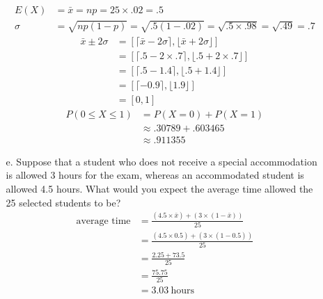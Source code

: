 \documentclass[letterpaper,12pt]{article}
\begin{document}
\begin{enumerate}
\begin{enumerate}
        \begin{align*}
          E(X) &= \bar{x} = np = 25 \times .02 = .5 \\
          \sigma &= \sqrt{np(1 - p)} = \sqrt{.5(1 - .02)} = \sqrt{.5 \times .98} = \sqrt{.49}  = .7
        \end{align*}
        \begin{align*}
          \bar{x} \pm 2\sigma &= [\lceil \bar{x} - 2\sigma \rceil, \lfloor \bar{x} + 2\sigma \rfloor] \\
          &= [\lceil .5 - 2 \times .7 \rceil, \lfloor .5 + 2 \times .7 \rfloor] \\
          &= [\lceil .5 - 1.4 \rceil, \lfloor .5 + 1.4 \rfloor] \\
          &= [\lceil -0.9 \rceil, \lfloor 1.9 \rfloor] \\
          &= [0, 1]
        \end{align*}
        \begin{align*}
          P(0 \le X \le 1) &= P(X = 0) + P(X = 1) \\
          &\approx .30789 + .603465 \\
          &\approx .911355
        \end{align*}
      \item[e.]
        Suppose that a student who does not receive a special accommodation is allowed 3 hours for the exam, whereas an accommodated student is allowed 4.5 hours. What would you expect the average time allowed the 25 selected students to be?
        \begin{align*}
          \text{average time} &= \frac{(4.5 \times \bar{x}) + (3 \times (1 - \bar{x}))}{25} \\
          &= \frac{(4.5 \times 0.5) + (3 \times (1 - 0.5))}{25} \\
          &= \frac{2.25 + 73.5}{25} \\
          &= \frac{75.75}{25} \\
          &= 3.03\ \text{hours}
        \end{align*}
    \end{enumerate}
\end{enumerate}
\end{document}
